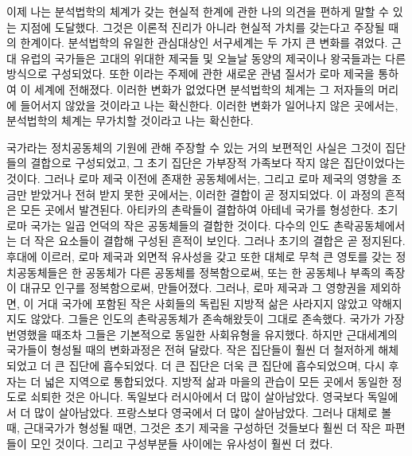 이제 나는
분석법학의 체계가
갖는 현실적 한계에 관한 나의 의견을 편하게 말할 수 있는
지점에 도달했다.
그것은 이론적 진리가 아니라 현실적 가치를 갖는다고
주장될 때의 한계이다.
분석법학의 유일한 관심대상인
서구세계는 두 가지 큰 변화를 겪었다.
근대 유럽의 국가들은  고대의 위대한 제국들 및
오늘날 동양의 제국이나 왕국들과는 다른
방식으로 구성되었다.
또한 이라는 주제에 관한 새로운 관념 질서가
로마 제국을 통하여 이 세계에 전해졌다.
이러한 변화가 없었다면 분석법학의 체계는 그 저자들의 머리에
들어서지 않았을 것이라고 나는 확신한다.
이러한 변화가 일어나지 않은 곳에서는,
분석법학의 체계는 무가치할 것이라고 나는 확신한다.

국가라는 정치공동체의 기원에 관해 주장할 수 있는 거의 보편적인 사실은
그것이 집단들의 결합으로 구성되었고, 그 초기 집단은
가부장적 가족보다 작지 않은 집단이었다는 것이다.
그러나 로마 제국 이전에 존재한 공동체에서는,
그리고 로마 제국의 영향을 조금만 받았거나 전혀 받지 못한 곳에서는,
이러한 결합이 곧 정지되었다.
이 과정의 흔적은 모든 곳에서 발견된다.
아티카의 촌락들이 결합하여 아테네 국가를 형성한다.
초기 로마 국가는 일곱 언덕의 작은 공동체들의 결합한 것이다.
다수의 인도 촌락공동체에서는 더 작은 요소들이 결합해 구성된 흔적이 보인다.
그러나 초기의 결합은 곧 정지된다.
후대에 이르러,
로마 제국과 외면적 유사성을 갖고 또한 대체로 무척 큰 영토를 갖는
정치공동체들은
한 공동체가 다른 공동체를 정복함으로써,
또는 한 공동체나 부족의 족장이
대규모 인구를 정복함으로써,
만들어졌다.
그러나, 로마 제국과 그 영향권을 제외하면,
이 거대 국가에 포함된 작은 사회들의 독립된 지방적 삶은
사라지지 않았고 약해지지도 않았다.
그들은 인도의 촌락공동체가 존속해왔듯이 그대로 존속했다.
국가가 가장 번영했을 때조차 그들은 기본적으로 동일한 사회유형을 유지했다.
하지만 근대세계의 국가들이 형성될 때의 변화과정은 전혀 달랐다.
작은 집단들이 훨씬 더 철저하게 해체되었고 더 큰 집단에 흡수되었다.
더 큰 집단은 더욱 큰 집단에 흡수되었으며,
다시 후자는 더 넓은 지역으로 통합되었다.
지방적 삶과 마을의 관습이 모든 곳에서 동일한 정도로 쇠퇴한 것은 아니다.
독일보다 러시아에서 더 많이 살아남았다.
영국보다 독일에서 더 많이 살아남았다.
프랑스보다 영국에서 더 많이 살아남았다.
그러나 대체로 볼 때,
근대국가가 형성될 때면, 그것은
초기 제국을 구성하던 것들보다 훨씬 더 작은 파편들이 모인 것이다.
그리고 구성부분들 사이에는 유사성이 훨씬 더 컸다.

